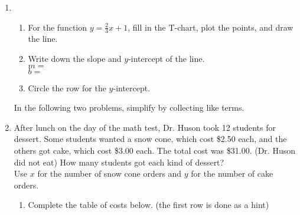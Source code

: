 \documentclass[12pt, oneside]{article}
\begin{document}
\begin{enumerate}
\newpage
\item
\begin{enumerate}
  \item For the function $y= \frac{2}{3}x+1$, fill in the T-chart, plot the points, and draw the line.
    \begin{center} %
    \end{center}
    \item Write down the slope and $y$-intercept of the line.\\[0.5cm]
    $m=$\\[0.5cm]
    $b=$\\[0.5cm]
    \item Circle the row for the $y$-intercept.
\end{enumerate}
\vspace{1cm}

In the following two problems, simplify by collecting like terms.

\newpage

  \item After lunch on the day of the math test, Dr. Huson took 12 students for dessert. Some students wanted a snow cone, which cost \$2.50 each, and the others got cake, which cost \$3.00 each. The total cost was \$31.00. (Dr. Huson did not eat) How many students got each kind of dessert? \\[0.5cm]
  Use $x$ for the number of snow cone orders and $y$ for the number of cake orders.
  \begin{enumerate}
    \item Complete the table of costs below. (the first row is done as a hint)


\end{enumerate}
\end{enumerate}
\end{document}
